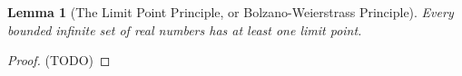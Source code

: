 \documentclass[onecolumn]{ctexart}
\newtheorem{lemma}{Lemma}
\begin{document}
\begin{lemma}[The Limit Point Principle, or Bolzano-Weierstrass Principle]
  Every bounded infinite set of real numbers has at least one limit point.
\end{lemma}
\begin{proof}
  (TODO)
\end{proof}
\end{document}
